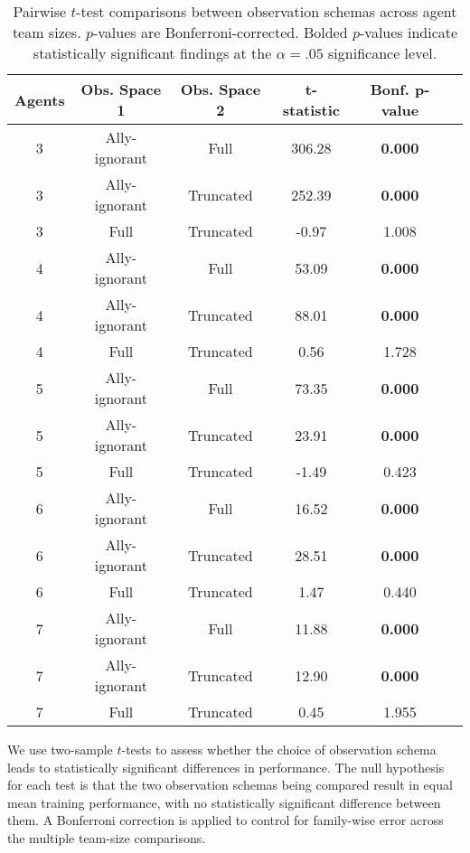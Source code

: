 \documentclass{article}
\begin{document}
\begin{table}[!ht]
    \centering
    \caption{Pairwise $t$-test comparisons between observation schemas across agent team sizes. 
    $p$-values are Bonferroni-corrected. Bolded $p$-values indicate statistically significant 
    findings at the $\alpha = .05$ significance level.
    }
    \label{con1:tab:observation_comparisons}
    \begin{tabular}{cccccc}
    \toprule
    \textbf{Agents} & \multicolumn{1}{c}{\textbf{Obs. Space 1}} & 
    \multicolumn{1}{c}{\textbf{Obs. Space 2}} & \textbf{t-statistic} & \textbf{Bonf. p-value} \\
    \midrule
    3 & Ally-ignorant & Full            & 306.28  & \textbf{0.000} \\
    3 & Ally-ignorant & Truncated       & 252.39  & \textbf{0.000} \\
    3 & Full          & Truncated       & -0.97   & 1.008 \\
    4 & Ally-ignorant & Full            & 53.09   & \textbf{0.000} \\
    4 & Ally-ignorant & Truncated       & 88.01   & \textbf{0.000} \\
    4 & Full          & Truncated       & 0.56    & 1.728 \\
    5 & Ally-ignorant & Full            & 73.35   & \textbf{0.000} \\
    5 & Ally-ignorant & Truncated       & 23.91   & \textbf{0.000} \\
    5 & Full          & Truncated       & -1.49   & 0.423 \\
    6 & Ally-ignorant & Full            & 16.52   & \textbf{0.000} \\
    6 & Ally-ignorant & Truncated       & 28.51   & \textbf{0.000} \\
    6 & Full          & Truncated       & 1.47    & 0.440 \\
    7 & Ally-ignorant & Full            & 11.88   & \textbf{0.000} \\
    7 & Ally-ignorant & Truncated       & 12.90   & \textbf{0.000} \\
    7 & Full          & Truncated       & 0.45    & 1.955 \\
    \bottomrule
    \end{tabular}
\end{table}

We use two-sample \(t\)-tests to assess whether the choice of observation 
schema leads to statistically significant differences in performance.
The null hypothesis for each test is that the two observation schemas 
being compared result in equal mean training performance, 
with no statistically significant difference between them.
A Bonferroni correction is applied to control for family-wise error 
across the multiple team-size comparisons.
\end{document}
